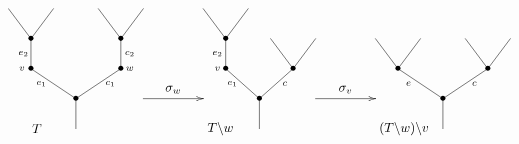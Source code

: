 \documentclass[../main.tex]{subfiles}
\begin{document}
\begin{equation}
    \xy
    <0.08cm, 0cm>:
    (0.0, 0.0)*{}="1"; %
    (0.0, 10.0)*=0{\bullet}="2"; %
    (-15.0, 20.0)*=0{\bullet}="3"; %
    (-15.0, 30.0)*=0{\bullet}="4"; %
    (-22.5, 40.0)*{}="5"; %
    (-7.5, 40.0)*{}="6"; %
    (15.0, 20.0)*=0{\bullet}="7"; %
    (15.0, 30.0)*=0{\bullet}="8"; %
    (7.5, 40.0)*{}="9"; %
    (22.5, 40.0)*{}="10"; %
    "1";"2" **\dir{-};
    "2";"3" **\dir{-};
    "3";"4" **\dir{-};
    "4";"5" **\dir{-};
    "4";"6" **\dir{-};
    "2";"7" **\dir{-};
    "7";"8" **\dir{-};
    "8";"9" **\dir{-};
    "8";"10" **\dir{-};
    (-18.0, 20.0)*=0{\scriptstyle v};
    (-11.5, 15.0)*=0{\scriptstyle e_1};
    (-17.5, 25.0)*=0{\scriptstyle e_2};
    (18.0, 20.0)*=0{\scriptstyle w};
    (11.5, 15.0)*=0{\scriptstyle c_1};
    (18, 25.0)*=0{\scriptstyle c_2};
    (-13,0)*{T};
    \endxy
    \xy
    <0.08cm, 0cm>:
    (-10, 0.0)*{}="1";
    (10, 0.0)*{}="2";
    (10, 10)*{}="3";
    (-10, 0)*{}="4";
    {\ar(-10, 10)*{};(10,10)*{}};
    (0,13)*{\sigma_w};
    \endxy
    \xy
    <0.08cm, 0cm>:
    (0.0, 0.0)*{}="1"; %
    (0.0, 10.0)*=0{\bullet}="2"; %
    (-11.25, 20.0)*=0{\bullet}="3"; %
    (-11.25, 30.0)*=0{\bullet}="4"; %
    (-18.75, 40.0)*{}="5"; %
    (-3.75, 40.0)*{}="6"; %
    (11.25, 20.0)*=0{\bullet}="7"; %
    (3.75, 30.0)*{}="8"; %
    (18.75, 30.0)*{}="9"; %
    "1";"2" **\dir{-};
    "2";"3" **\dir{-};
    "3";"4" **\dir{-};
    "4";"5" **\dir{-};
    "4";"6" **\dir{-};
    "2";"7" **\dir{-};
    "7";"8" **\dir{-};
    "7";"9" **\dir{-};
    (-14.0, 20.0)*=0{\scriptstyle v};
    (-9, 15.0)*=0{\scriptstyle e_1};
    (-14, 25.0)*=0{\scriptstyle e_2};
    (8.5, 15.0)*=0{\scriptstyle c};
    (-13,0)*{T\backslash w};
    \endxy
    \xy
    <0.08cm, 0cm>:
    (-10, 0.0)*{}="1";
    (10, 0.0)*{}="2";
    (10, 10)*{}="3";
    (-10, 0)*{}="4";
    {\ar(-10, 10)*{};(10,10)*{}};
    (0,13)*{\sigma_v};
    \endxy
    \xy
    <0.08cm, 0cm>:
    (0.0, 0.0)*{}="1"; %
    (0.0, 10.0)*=0{\bullet}="2"; %
    (-15.0, 20.0)*=0{\bullet}="3"; %
    (-22.5, 30.0)*{}="4"; %
    (-7.5, 30.0)*{}="5"; %
    (15.0, 20.0)*=0{\bullet}="6"; %
    (7.5, 30.0)*{}="7"; %
    (22.5, 30.0)*{}="8"; %
    "1";"2" **\dir{-};
    "2";"3" **\dir{-};
    "3";"4" **\dir{-};
    "3";"5" **\dir{-};
    "2";"6" **\dir{-};
    "6";"7" **\dir{-};
    "6";"8" **\dir{-};
    (-11.5, 15.0)*=0{\scriptstyle e};
    (10.5, 15.0)*=0{\scriptstyle c};
    (-13,0)*{(T\backslash w)\backslash v};
    \endxy
\end{equation}
\end{document}
